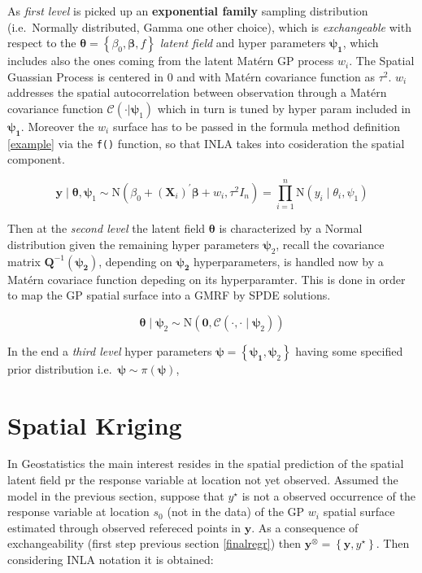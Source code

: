\documentclass[
  12pt,
  a4paper,
  oneside]{book}
\theoremstyle{definition}
\theoremstyle{definition}
\theoremstyle{definition}
\theoremstyle{remark}
\begin{document}
As \emph{first level} is picked up an \textbf{exponential family} sampling distribution (i.e.~Normally distributed, Gamma one other choice), which is \emph{exchangeable} with respect to the \(\boldsymbol{\theta}=\left\{\beta_{0}, \boldsymbol{\beta}, f\right\}\) \emph{latent field} and hyper parameters \(\boldsymbol{\psi_{1}}\), which includes also the ones coming from the latent Matérn GP process \(w_{i}\). The Spatial Guassian Process is centered in 0 and with Matérn covariance function as \(\tau^2\). \(w_{i}\) addresses the spatial autocorrelation between observation through a Matérn covariance function \(\mathcal{C}(\cdot | \boldsymbol\psi_{1})\) which in turn is tuned by hyper param included in \(\boldsymbol{\psi_1}\). Moreover the \(w_{i}\) surface has to be passed in the formula method definition \ref{example} via the \texttt{f()} function, so that INLA takes into cosideration the spatial component.

\[
\boldsymbol{y} \mid \boldsymbol{\theta}, \boldsymbol{\psi}_{1} \sim \mathrm{N}\left(\beta_{0}+ (\mathbf{X}_{i})^{\prime}\boldsymbol{\beta} + w_{i} ,  \tau^2 I_{n}\right)=\prod_{i=1}^{n} \mathrm{N}\left(y_{i} \mid \theta_{i}, \psi_{1}\right)
\]

Then at the \emph{second level} the latent field \(\boldsymbol{\theta}\) is characterized by a Normal distribution given the remaining hyper parameters \(\boldsymbol{\psi}_2\), recall the covariance matrix \(\boldsymbol{Q}^{-1}(\boldsymbol{\psi_{2}})\), depending on \(\boldsymbol{\psi_{2}}\) hyperparameters, is handled now by a Matérn covariace function depeding on its hyperparamter. This is done in order to map the GP spatial surface into a GMRF by SPDE solutions.

\[
\boldsymbol{\theta} \mid \boldsymbol{\psi}_{2} \sim \mathrm{N}\left(\boldsymbol{0}, \mathcal{C}( \cdot , \cdot  \mid \boldsymbol{\psi}_{2})\right)
\]

In the end a \emph{third level} hyper parameters \(\boldsymbol{\psi}=\left\{\boldsymbol{\psi_{1}}, \boldsymbol{\psi}_{2}\right\}\) having some specified prior distribution i.e.~\(\boldsymbol{\psi} \sim \pi(\boldsymbol{\psi})\),

\hypertarget{spatial-kriging}{%
\section{Spatial Kriging}\label{spatial-kriging}}

In Geostatistics the main interest resides in the spatial prediction of the spatial latent field pr the response variable at location not yet observed.
Assumed the model in the previous section, suppose that \(y^{\star}\) is not a observed occurrence of the response variable at location \(s_{0}\) (not in the data) of the GP \(w_{i}\) spatial surface estimated through observed refereced points in \(\boldsymbol{y}\). As a consequence of exchangeability (first step previous section \ref{finalregr}) then \(\boldsymbol{y}^{\otimes}=\left\{\boldsymbol{y}, y^{\star}\right\}\). Then considering INLA notation it is obtained:
\end{document}
